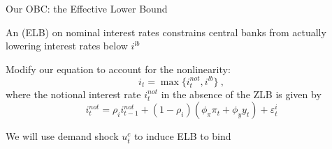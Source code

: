 \begin{frame}{Our OBC: the Effective Lower Bound}
	\begin{wideitemize}
	    \item An  (ELB) on nominal interest rates constrains central banks from actually lowering interest rates below $i^{lb}$
         \item Modify our equation to account for the nonlinearity:
        \begin{equation}
	        i_t = \max\{i_t^{not},i^{lb}\} \: ,
        \end{equation}
        where the notional interest rate $i_t^{not}$ in the absence of the ZLB is given by
        \begin{equation}	
        i_t^{not}=\rho_i i_{t-1}^{not}+ (1-\rho_i)(\phi_\pi \pi_t + \phi_y y_t) + \varepsilon_t^i
        \end{equation}
        \item We will use demand shock $u_t^c$ to induce ELB to bind
	\end{wideitemize}
\end{frame}




